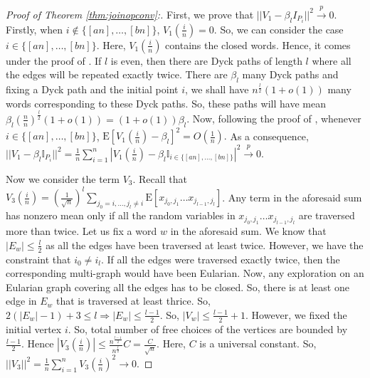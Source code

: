 \documentclass[reqno,12pt]{amsart}
\theoremstyle{plain}
\theoremstyle{definition}
\begin{document}
\begin{proof}[Proof of Theorem \ref{thm:joinopconv}:]
    \noindent 
    First, we prove that $||V_{1}-\beta_{l}I_{P_{i}}||^{2} \stackrel{p}{\to} 0.$
    Firstly, when $i \notin \{ [an],\ldots,[bn] \}$, $V_{1}\left( \frac{i}{n} \right)=0$. So, we can consider the case $i \in \{ [an],\ldots, [bn] \}$. Here,
    $V_{1}\left( \frac{i}{n} \right)$ contains the closed words. Hence, it comes under the proof of \cite{AZ05}. If $l$ is even, then there are Dyck paths of length $l$ where all the edges will be repeated exactly twice. There are $\beta_{l}$ many Dyck paths and fixing a Dyck path and the initial point $i$, we shall have $n^{\frac{l}{2}}(1+o(1))$ many words corresponding to these Dyck paths. So, these paths will have mean $\beta_{l} \left( \frac{n}{n} \right)^{\frac{l}{2}}(1+o(1))=(1+o(1))\beta_{l}$. Now, following the proof of \cite{AZ05}, whenever $i \in \{ [an],\ldots,[bn] \}$, $\mathrm{E}\left[ V_{1}\left( \frac{i}{n} \right)-\beta_{l} \right]^{2}=O\left(\frac{1}{n}\right).$ As a consequence, $||V_{1}- \beta_{l}\mathbb{I}_{P_{i}}||^{2}= \frac{1}{n}\sum_{i=1}^{n}|V_{1}\left( \frac{i}{n} \right)- \beta_{l}\mathbb{I}_{i \in \{  [an],\ldots,[bn]\}}|^2 \stackrel{p}{\to} 0.$ 

    \noindent 
    Now we consider the term $V_{3}$. Recall that $V_{3}\left( \frac{i}{n} \right)= \left( \frac{1}{\sqrt{n}} \right)^{l} \sum_{j_{0}=i,\ldots, j_{l}\neq i}\mathrm{E}\left[ x_{j_{0},j_{1}}\ldots x_{j_{l-1},j_{l}} \right]$. Any term in the aforesaid sum has nonzero mean only if all the random variables in $x_{j_{0},j_{1}}\ldots x_{j_{l-1},j_{l}}$ are traversed more than twice. Let us fix a word $w$ in the aforesaid sum. We know that $|E_{w}| \le \frac{l}{2}$ as all the edges have been traversed at least twice. However, we have the constraint that $i_{0} \neq i_{l}$. If all the edges were traversed exactly twice, then the corresponding multi-graph would have been Eularian. Now, any exploration on an Eularian graph covering all the edges has to be closed. So, there is at least one edge in $E_{w}$ that is traversed at least thrice. So, $2(|E_{w}|-1)+3 \le l \Rightarrow |E_{w}|\le \frac{l-1}{2}.$ So, $|V_{w}|\le \frac{l-1}{2}+1$. However, we fixed the initial vertex $i$. So, total number of free choices of the vertices are bounded by $\frac{l-1}{2}$. Hence $|V_{3}\left( \frac{i}{n} \right)|\le \frac{n^{\frac{l-1}{2}}}{n^{\frac{l}{2}}}C=\frac{C}{\sqrt{n}}$. Here, $C$ is a universal constant. So,  $||V_{3}||^{2}= \frac{1}{n}\sum_{i=1}^{n} V_{3}\left( \frac{i}{n} \right)^2 \to 0.$ 


\end{proof}
\end{document}
